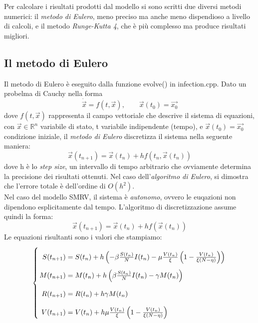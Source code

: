 \documentclass{article}
\begin{document}
\hspace{\parindent} Per calcolare i risultati prodotti dal modello 
si sono scritti due diversi metodi numerici: il \textit{metodo di Eulero},
meno preciso ma anche meno dispendioso a livello di calcoli, e il 
metodo \textit{Runge-Kutta 4}, che è più complesso ma produce 
risultati migliori.

\subsection{Il metodo di Eulero}
Il metodo di Eulero è eseguito dalla funzione evolve() in 
infection.cpp. Dato un probelma di Cauchy nella forma
\begin{equation} \label{eq::ODE} 
    \dot{\vec{x}} = f(t, \vec{x}), \qquad \vec{x}(t_0) = \vec{x_0}
\end{equation}
dove $f(t, \vec{x})$ rappresenta il campo vettoriale che descrive il 
sistema di equazioni, con $\vec{x} \in \mathbb{R}^n$ variabile di stato, 
t variabile indipendente (tempo), e $\vec{x}(t_0) = \vec{x_0}$
condizione iniziale, il \textit{metodo di Eulero} discretizza il 
sistema nella seguente maniera:
\begin{equation} \label{eq::Euler}
    \vec{x}(t_{n+1})=\vec{x}(t_n) + h f(t_n, \vec{x}(t_n))
\end{equation}
dove h è lo \textit{step size}, un intervallo di tempo arbitrario che 
ovviamente determina la precisione dei risultati ottenuti. 
Nel caso dell'\textit{algoritmo di Eulero}, si dimostra che l'errore 
totale è dell'ordine di $O(h^2)$. \\
Nel caso del modello SMRV, il sistema è \textit{autonomo}, ovvero le 
euqazioni non dipendono esplicitamente dal tempo. L'algoritmo di 
discretizzazione assume quindi la forma: 
\begin{equation} \label{eq::autoEuler}
    \vec{x}(t_{n+1})=\vec{x}(t_n) + h f(\vec{x}(t_n))
\end{equation}
Le equazioni risultanti sono i valori che stampiamo:
\begin{equation}\label{eq::evolve}
    \left\{ \arraycolsep=1.4pt\def\arraystretch{2.2}
    \begin{array}{rcl}
    S(t_{n+1}) & = & S(t_n) + h \left(-\beta \frac{S(t_n)}{N} I(t_n)
            - \mu \frac{V(t_n)}{\xi} \left(
            1 - \frac{V(t_n)}{\xi (N - \eta)} \right) \right) \\
    M(t_{n+1}) & = & M(t_n)+h\left(\beta \frac{S(t_n)}{N} I(t_n) 
            - \gamma M(t_n)\right) \\
    R(t_{n+1}) & = & R(t_n) + h \gamma M(t_n) \\
    V(t_{n+1}) & = & V(t_n) +h \mu \frac{V(t_n)}{\xi} \left(
            1 - \frac{V(t_n)}{\xi (N - \eta)} \right) \\
    \end{array}\right.
\end{equation}
\end{document}
